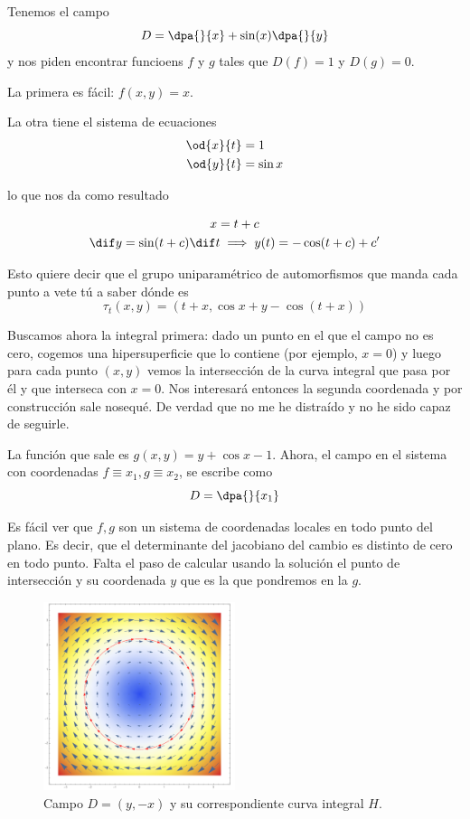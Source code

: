 \begin{example}
Tenemos el campo
\[ D = \dpa{}{x} + \sin(x) \dpa{}{y} \]
y nos piden encontrar funcioens $f$ y $g$ tales que $D(f) = 1$ y $D(g) = 0$.

La primera es fácil: $f(x,y) = x$.

La otra tiene el sistema de ecuaciones
\begin{align*}
\od{x}{t} &= 1 \\
 \od{y}{t} &= \sin x
\end{align*}

lo que nos da como resultado

\begin{gather*}
x = t + c \\
\dif y = \sin(t+c) \dif t \implies y(t) = - \cos(t + c) + c'
\end{gather*}

Esto quiere decir que el grupo uniparamétrico de automorfismos que manda cada punto a vete tú a saber dónde es \[ τ_t(x,y) = \left(t+x, \cos x + y - \cos(t+x)\right)\]

Buscamos ahora la integral primera: dado un punto en el que el campo no es cero, cogemos una hipersuperficie que lo contiene (por ejemplo, $x=0$) y luego para cada punto $(x,y)$ vemos la intersección de la curva integral que pasa por él y que interseca con $x = 0$. Nos interesará entonces la segunda coordenada y por construcción sale nosequé. De verdad que no me he distraído y no he sido capaz de seguirle.

La función que sale es $g(x,y) = y + \cos x - 1$. Ahora, el campo en el sistema con coordenadas $f \equiv x_1,g \equiv x_2$, se escribe como \[ D = \dpa{}{x_1} \]

Es fácil ver que $f,g$ son un sistema de coordenadas locales en todo punto del plano. Es decir, que el determinante del jacobiano del cambio es distinto de cero en todo punto. Falta el paso de calcular usando la solución el punto de intersección y su coordenada $y$ que es la que pondremos en la $g$.

\begin{figure}[hbtp]
\centering
\includegraphics[width=0.5\textwidth]{img/III_CampoCircular.png}
\caption{Campo $D = (y, -x)$ y su correspondiente curva integral $H$.}
\end{figure}
\end{example}

